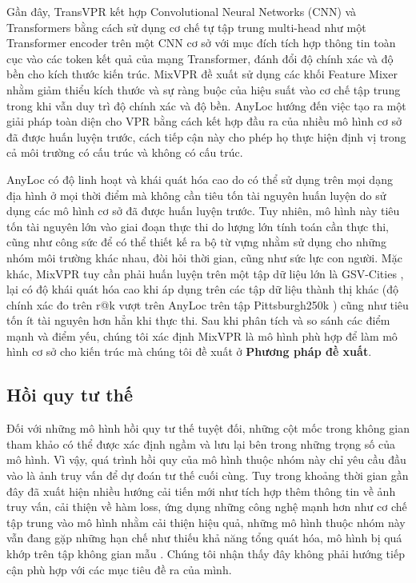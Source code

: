 Gần đây, TransVPR \cite{wang2022transvpr} kết hợp Convolutional Neural Networks (CNN) và Transformers \cite{vaswani2023attention} bằng cách sử dụng cơ chế tự tập trung multi-head như một Transformer encoder trên một CNN cơ sở với mục đích tích hợp thông tin toàn cục vào các token kết quả của mạng Transformer, đánh đổi độ chính xác và độ bền cho kích thước kiến trúc. MixVPR \cite{alibey2023mixvpr} đề xuất sử dụng các khối Feature Mixer nhằm giảm thiểu kích thước và sự ràng buộc của hiệu suất vào cơ chế tập trung trong khi vẫn duy trì độ chính xác và độ bền. AnyLoc \cite{keetha2023anyloc} hướng đến việc tạo ra một giải pháp toàn diện cho VPR bằng cách kết hợp đầu ra của nhiều mô hình cơ sở đã được huấn luyện trước, cách tiếp cận này cho phép họ thực hiện định vị trong cả môi trường có cấu trúc và không có cấu trúc.

AnyLoc \cite{keetha2023anyloc} có độ linh hoạt và khái quát hóa cao do có thể sử dụng trên mọi dạng địa hình ở mọi thời điểm mà không cần tiêu tốn tài nguyên huấn luyện do sử dụng các mô hình cơ sở đã được huấn luyện trước. Tuy nhiên, mô hình này tiêu tốn tài nguyên lớn vào giai đoạn thực thi do lượng lớn tính toán cần thực thi, cũng như công sức để có thể thiết kế ra bộ từ vựng nhằm sử dụng cho những nhóm môi trường khác nhau, đòi hỏi thời gian, cũng như sức lực con người. Mặc khác, MixVPR \cite{alibey2023mixvpr} tuy cần phải huấn luyện trên một tập dữ liệu lớn là GSV-Cities \cite{Ali_bey_2022}, lại có độ khái quát hóa cao khi áp dụng trên các tập dữ liệu thành thị khác (độ chính xác đo trên r@k vượt trên AnyLoc trên tập Pittsburgh250k \cite{6618963}) cũng như tiêu tốn ít tài nguyên hơn hẳn khi thực thi. Sau khi phân tích và so sánh các điểm mạnh và điểm yếu, chúng tôi xác định MixVPR \cite{alibey2023mixvpr} là mô hình phù hợp để làm mô hình cơ sở cho kiến trúc mà chúng tôi đề xuất ở \textbf{Phương pháp đề xuất}.

\subsection*{Hồi quy tư thế}

Đối với những mô hình hồi quy tư thế tuyệt đối, những cột mốc trong không gian tham khảo có thể được xác định ngầm và lưu lại bên trong những trọng số của mô hình. Vì vậy, quá trình hồi quy của mô hình thuộc nhóm này chỉ yêu cầu đầu vào là ảnh truy vấn để dự đoán tư thế cuối cùng. Tuy trong khoảng thời gian gần đây đã xuất hiện nhiều hướng cải tiến mới như tích hợp thêm thông tin về ảnh truy vấn, cải thiện về hàm loss, ứng dụng những công nghệ mạnh hơn như cơ chế tập trung vào mô hình nhằm cải thiện hiệu quả, những mô hình thuộc nhóm này vẫn đang gặp những hạn chế như thiếu khả năng tổng quát hóa, mô hình bị quá khớp trên tập không gian mẫu \cite{sattler2019understanding}. Chúng tôi nhận thấy đây không phải hướng tiếp cận phù hợp với các mục tiêu đề ra của mình.

